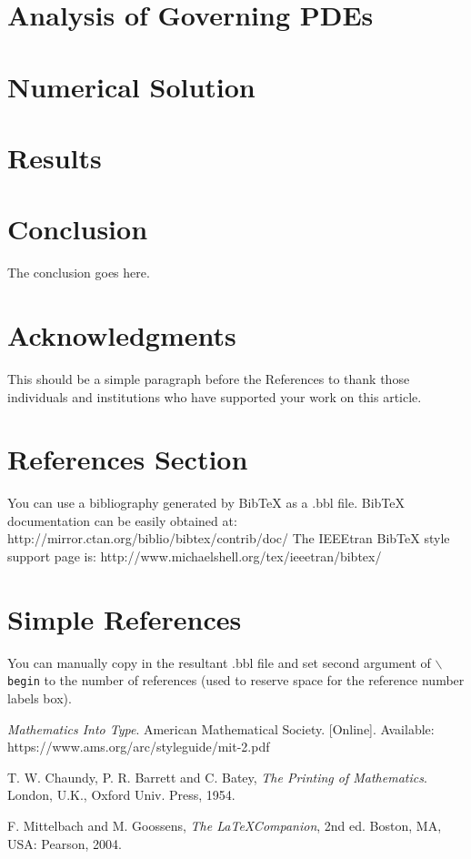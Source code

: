 \documentclass[lettersize,journal]{IEEEtran}
\begin{document}
\section{Analysis of Governing PDEs}

\section{Numerical Solution}

\section{Results}

\section{Conclusion}
The conclusion goes here.


\section*{Acknowledgments}
This should be a simple paragraph before the References to thank those individuals and institutions who have supported your work on this article.

\section{References Section}
You can use a bibliography generated by BibTeX as a .bbl file.
 BibTeX documentation can be easily obtained at:
 http://mirror.ctan.org/biblio/bibtex/contrib/doc/
 The IEEEtran BibTeX style support page is:
 http://www.michaelshell.org/tex/ieeetran/bibtex/

%
%
\section{Simple References}
You can manually copy in the resultant .bbl file and set second argument of $\backslash${\tt{begin}} to the number of references
 (used to reserve space for the reference number labels box).

\begin{thebibliography}{1}


{\it{Mathematics Into Type}}. American Mathematical Society. [Online]. Available: https://www.ams.org/arc/styleguide/mit-2.pdf

T. W. Chaundy, P. R. Barrett and C. Batey, {\it{The Printing of Mathematics}}. London, U.K., Oxford Univ. Press, 1954.

F. Mittelbach and M. Goossens, {\it{The \LaTeX Companion}}, 2nd ed. Boston, MA, USA: Pearson, 2004.

\end{thebibliography}
\end{document}
